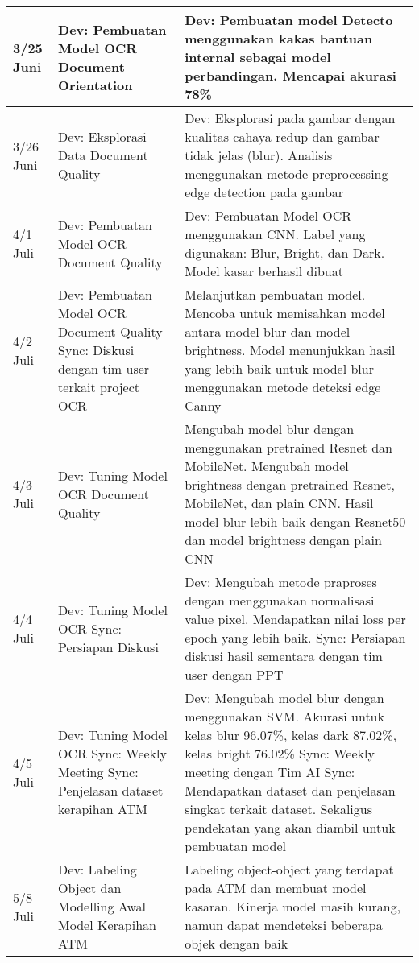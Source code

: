 \begin{longtable}{|p{5em}|p{10em}|p{15em}|}
        3/25 Juni & Dev: Pembuatan Model OCR Document Orientation & Dev: Pembuatan model Detecto menggunakan kakas bantuan internal sebagai model perbandingan. Mencapai akurasi 78\% \\ \hline
        3/26 Juni & Dev: Eksplorasi Data Document Quality & Dev: Eksplorasi pada gambar dengan kualitas cahaya redup dan gambar tidak jelas (blur). Analisis menggunakan metode preprocessing edge detection pada gambar \\ \hline
        4/1 Juli & Dev: Pembuatan Model OCR Document Quality & Dev: Pembuatan Model OCR menggunakan CNN. Label yang digunakan: Blur, Bright, dan Dark. Model kasar berhasil dibuat \\ \hline
        4/2 Juli & Dev: Pembuatan Model OCR Document Quality \newline Sync: Diskusi dengan tim user terkait project OCR & Melanjutkan pembuatan model. Mencoba untuk memisahkan model antara model blur dan model brightness. Model menunjukkan hasil yang lebih baik untuk model blur menggunakan metode deteksi edge Canny \\ \hline
        4/3 Juli & Dev: Tuning Model OCR Document Quality & Mengubah model blur dengan menggunakan pretrained Resnet dan MobileNet. Mengubah model brightness dengan pretrained Resnet, MobileNet, dan plain CNN. Hasil model blur lebih baik dengan Resnet50 dan model brightness dengan plain CNN \\ \hline
        4/4 Juli & Dev: Tuning Model OCR \newline 
Sync: Persiapan Diskusi & Dev: Mengubah metode praproses dengan menggunakan normalisasi value pixel. Mendapatkan nilai loss per epoch yang lebih baik.  \newline 
Sync: Persiapan diskusi hasil sementara dengan tim user dengan PPT \\ \hline
        4/5 Juli & Dev: Tuning Model OCR \newline 
Sync: Weekly Meeting \newline 
Sync: Penjelasan dataset kerapihan ATM & Dev: Mengubah model blur dengan menggunakan SVM. Akurasi untuk kelas blur 96.07\%, kelas dark 87.02\%, kelas bright 76.02\% \newline 
Sync: Weekly meeting dengan Tim AI \newline 
Sync: Mendapatkan dataset dan penjelasan singkat terkait dataset. Sekaligus pendekatan yang akan diambil untuk pembuatan model \\ \hline
        5/8 Juli & Dev: Labeling Object dan Modelling Awal Model Kerapihan ATM & Labeling object-object yang terdapat pada ATM dan membuat model kasaran. Kinerja model masih kurang, namun dapat mendeteksi beberapa objek dengan baik \\ \hline

\end{longtable}
